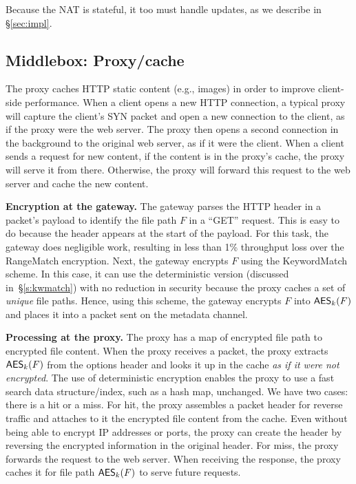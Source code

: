 Because the NAT is stateful, it too must handle updates, as we describe in \S\ref{sec:impl}.

\subsection{Middlebox: Proxy/cache}\label{s:proxy}

The proxy  caches HTTP static content (e.g., images) in order to improve client-side performance. 
When a client opens a new HTTP connection, a typical proxy will capture the client's SYN packet and open a new connection to the client, as if the proxy were the web server. The proxy then opens a second connection in the background to the original web server, as if it were the client. 
When a client sends a request for new content, if the content is in the proxy's cache, the proxy will serve it from there. Otherwise, the proxy will forward this request to the web server and cache the new content. 

\noindent\textbf{Encryption at the gateway.} 
The gateway parses the HTTP header in a packet's payload to identify the file path $F$ in a ``GET'' request. 
This is easy to do because the header appears at the start of the payload. For this task, the gateway does negligible work, resulting in less than 1\% throughput loss over the RangeMatch encryption. 
Next, the gateway encrypts $F$ using the KeywordMatch scheme. In this case, it can use the deterministic version (discussed in~\S\ref{s:kwmatch}) with no reduction in security because the proxy caches a set of {\em unique} file paths. Hence, using this scheme, the gateway encrypts $F$ into $\mathsf{AES}_k(F)$ and places it into a packet sent on the metadata channel. %

\noindent\textbf{Processing at the proxy.} The proxy has a map of encrypted file path to encrypted file content. When the proxy receives a packet, the proxy extracts $\mathsf{AES}_k(F)$ from the options header and looks it up in the cache {\em as if it were not encrypted}. The use of deterministic encryption enables the proxy to use a fast search data structure/index, such as a hash map, unchanged. We have two cases: there is a hit or a miss. For hit, the proxy assembles a packet header for reverse traffic and attaches to it the encrypted file content from the cache. Even without being able to encrypt IP addresses or ports, the proxy can create the header by reversing the encrypted information in the original header.
For miss, the proxy forwards the request to the web server. When receiving the response, the proxy caches it for file path $\mathsf{AES}_k(F)$ to serve future requests.

